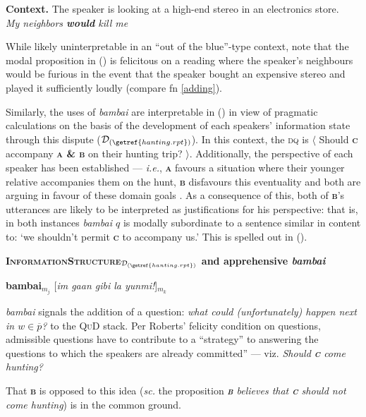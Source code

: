 \pex\textbf{Context.} The speaker is looking at a high-end stereo in an electronics store.\\
\textit{My neighbors \textbf{would} kill me}
\xe

\noindent While likely uninterpretable in an ``out of the blue''-type context, note that the modal proposition in (\lastx) is felicitous on a reading where the speaker's neighbours would be furious in the event that the speaker bought an expensive stereo and played it sufficiently loudly (compare fn \ref{adding}).


Similarly, the uses of \textit{bambai} are interpretable in () in view of pragmatic calculations on the basis of the development of each speakers' information state through this dispute ($ \mathcal D_{(\getref{hanting.rpt})} $). In this context, the \textsc{dq} is $ \langle $ Should \textbf{\textsc{c}} accompany \textbf{\textsc{a \& b}} on their hunting trip? $ \rangle $. Additionally, the perspective of each speaker has been established --- \textit{i.e.}, \textbf{\textsc{a}} favours a situation where their younger relative accompanies them on the hunt, \textbf{\textsc{b}} disfavours this eventuality and both are arguing in favour of these domain goals \citep[compare][215]{Roberts2004}. As a consequence of this, both of \textbf{\textsc{b}}'s utterances are likely to be interpreted as justifications for his perspective: that is, in both instances \textit{bambai $ q $} is modally subordinate to a sentence similar in content to: `we shouldn't permit \textbf{\textsc{c}} to accompany us.' This is spelled out in (\nextx).

\pex[labelformat=$\boldsymbol m_A$,pexcnt=106]  \textbf{\textsc{InformationStructure}$ _{\mathcal D_{(\getref{hanting.rpt})}} $ and apprehensive \emph{bambai}}

\textbf{bambai}$ _{m_j} $ [\textit{im gaan gibi la yunmi!}]$_{m_k}$

\a\textit{bambai} signals the addition of a question: \textit{what could (unfortunately) happen next in $ w\in\overline p $?} to the \textsc{QuD} stack. Per Roberts' felicity condition on questions, admissible questions have to contribute to a ``strategy'' to answering the questions to which the speakers are already committed'' --- viz. \textit{Should \textbf{\textsc{c}} come hunting?}

That \textbf{\textsc{b}} is opposed to this idea (\textit{sc.} the proposition \textit{\textbf{\textsc{b}} believes that \textbf{\textsc{c}} should not come hunting}) is in the common ground.

